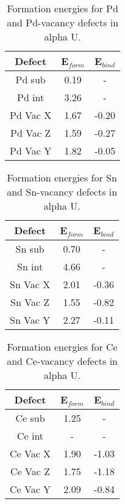 \documentclass[review]{elsarticle}
\begin{document}
\begin{table}[h!]
\caption{Formation energies for Pd and Pd-vacancy defects in alpha U.}
\label{tab:Eforms}
\begin{center}
\begin{tabular}{|c|c|c|}
     \hline
      Defect & E$_{form}$ & E$_{bind}$ \\
     \hline
     Pd sub & 0.19 & - \\
     Pd int & 3.26 & - \\
     Pd Vac X & 1.67 & -0.20 \\
     Pd Vac Z & 1.59 & -0.27 \\
     Pd Vac Y & 1.82 & -0.05 \\
       \hline
\end{tabular}
\end{center}
\label{default}
\end{table}%


\begin{table}[h!]
\caption{Formation energies for Sn and Sn-vacancy defects in alpha U.}
\label{tab:Eforms}
\begin{center}
\begin{tabular}{|c|c|c|}
     \hline
      Defect & E$_{form}$ & E$_{bind}$ \\
     \hline
     Sn sub & 0.70 & - \\
     Sn int & 4.66 & - \\
     Sn Vac X & 2.01 & -0.36 \\
     Sn Vac Z & 1.55 & -0.82 \\
     Sn Vac Y & 2.27 & -0.11 \\
       \hline
\end{tabular}
\end{center}
\label{default}
\end{table}%


\begin{table}[h!]
\caption{Formation energies for Ce and Ce-vacancy defects in alpha U.}
\label{tab:Eforms}
\begin{center}
\begin{tabular}{|c|c|c|}
     \hline
      Defect & E$_{form}$ & E$_{bind}$ \\
     \hline
     Ce sub & 1.25 & - \\
     Ce int & - & - \\
     Ce Vac X & 1.90 & -1.03 \\
     Ce Vac Z & 1.75 & -1.18 \\
     Ce Vac Y & 2.09 & -0.84 \\
       \hline
\end{tabular}
\end{center}
\label{default}
\end{table}%
\end{document}

